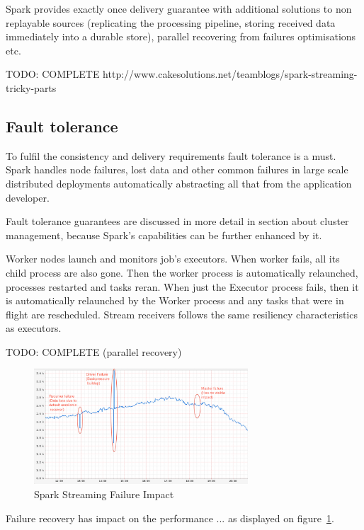 \documentclass[a4paper, 10 pt, conference]{IEEEtran}
\begin{document}
Spark provides exactly once delivery guarantee with additional solutions to non replayable sources (replicating the processing pipeline, storing received data immediately into a durable store), parallel recovering from failures optimisations etc.

TODO: COMPLETE http://www.cakesolutions.net/teamblogs/spark-streaming-tricky-parts

\subsection{Fault tolerance}
To fulfil the consistency and delivery requirements fault tolerance is a must. Spark handles node failures, lost data and other common failures in large scale distributed deployments automatically abstracting all that from the application developer.

Fault tolerance guarantees are discussed in more detail in section about cluster management, because Spark's capabilities can be further enhanced by it.

Worker nodes launch and monitors job's executors. When worker fails, all its child process are also gone. Then the worker process is automatically relaunched, processes restarted and tasks reran. When just the Executor process fails, then it is automatically relaunched by the Worker process and any tasks that were in flight are rescheduled. Stream receivers follows the same resiliency characteristics as 
executors.

TODO: COMPLETE (parallel recovery)

\begin{figure}[hb]
	\begin{center}
		\caption{Spark Streaming Failure Impact}
		\label{fig:sparkStreamingFailureImpact}
		\includegraphics[width=8cm,keepaspectratio]{spark-streaming-failure-impact.png}
	\end{center}
\end{figure}

Failure recovery has impact on the performance ... as displayed on figure~\ref{fig:sparkStreamingFailureImpact}.
\end{document}
